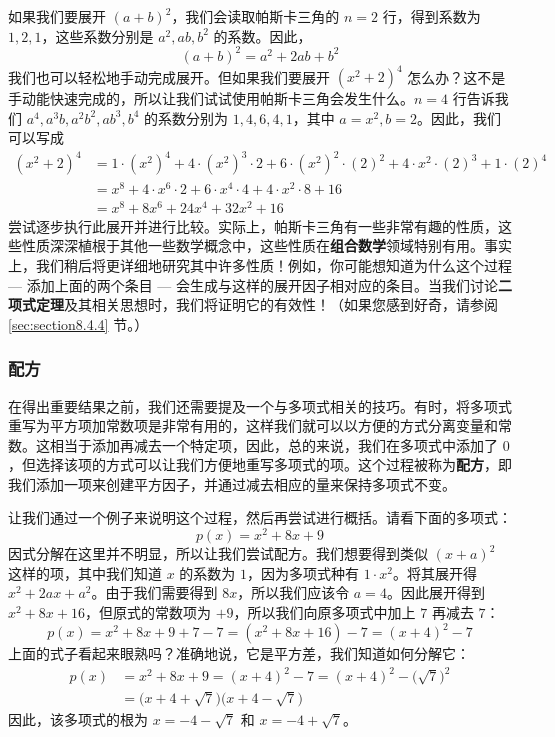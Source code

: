 如果我们要展开 $(a + b)^2$，我们会读取帕斯卡三角的 $n = 2$ 行，得到系数为 $1, 2, 1$，这些系数分别是 $a^2, ab, b^2$ 的系数。因此，
\[(a + b)^2 = a^2 + 2ab + b^2\]
我们也可以轻松地手动完成展开。但如果我们要展开 $(x^2+2)^4$ 怎么办？这不是手动能快速完成的，所以让我们试试使用帕斯卡三角会发生什么。$n = 4$ 行告诉我们 $a^4, a^3b, a^2b^2, ab^3, b^4$ 的系数分别为 $1, 4, 6, 4, 1$，其中 $a = x^2, b = 2$。因此，我们可以写成
\begin{align*}
    (x^2+2)^4 &=  1 \cdot (x^2)^4 + 4 \cdot (x^2)^3 \cdot 2 + 6 \cdot (x^2)^2 \cdot (2)^2 + 4 \cdot x^2 \cdot (2)^3 + 1 \cdot (2)^4 \\
    &=  x^8 + 4 \cdot x^6 \cdot 2 + 6 \cdot x^4 \cdot 4 + 4 \cdot x^2 \cdot 8 + 16 \\
    &= x^8 + 8x^6 + 24x^4 + 32x^2 + 16
\end{align*}
尝试逐步执行此展开并进行比较。实际上，帕斯卡三角有一些非常有趣的性质，这些性质深深植根于其他一些数学概念中，这些性质在\textbf{组合数学}领域特别有用。事实上，我们稍后将更详细地研究其中许多性质！例如，你可能想知道为什么这个过程 --- 添加上面的两个条目 --- 会生成与这样的展开因子相对应的条目。当我们讨论\textbf{二项式定理}及其相关思想时，我们将证明它的有效性！（如果您感到好奇，请参阅 \ref{sec:section8.4.4} 节。）

\subsubsection*{配方}

在得出重要结果之前，我们还需要提及一个与多项式相关的技巧。有时，将多项式重写为平方项加常数项是非常有用的，这样我们就可以以方便的方式分离变量和常数。这相当于添加再减去一个特定项，因此，总的来说，我们在多项式中添加了 $0$，但选择该项的方式可以让我们方便地重写多项式的项。这个过程被称为\textbf{配方}，即我们添加一项来创建平方因子，并通过减去相应的量来保持多项式不变。

让我们通过一个例子来说明这个过程，然后再尝试进行概括。请看下面的多项式：
\[p(x) = x^2 + 8x + 9\]
因式分解在这里并不明显，所以让我们尝试配方。我们想要得到类似 $(x + a)^2$ 这样的项，其中我们知道 $x$ 的系数为 $1$，因为多项式种有 $1 \cdot x^2$。将其展开得 $x^2+2ax+a^2$。由于我们需要得到 $8x$，所以我们应该令 $a = 4$。因此展开得到 $x^2 + 8x + 16$，但原式的常数项为 $+9$，所以我们向原多项式中加上 $7$ 再减去 $7$：
\[p(x) = x^2 + 8x + 9 + 7 - 7 = (x^2 + 8x + 16) - 7 = (x + 4)^2 - 7\]
上面的式子看起来眼熟吗？准确地说，它是平方差，我们知道如何分解它：
\begin{align*}
    p(x) &= x^2 + 8x + 9 = (x + 4)^2 - 7 = (x + 4)^2 - \Big(\sqrt 7\Big)^2 \\
    &= \Big(x+4+\sqrt 7\Big)\Big(x+4-\sqrt 7\Big)
\end{align*}
因此，该多项式的根为 $x=-4-\sqrt 7$ 和 $x=-4+\sqrt 7$。

